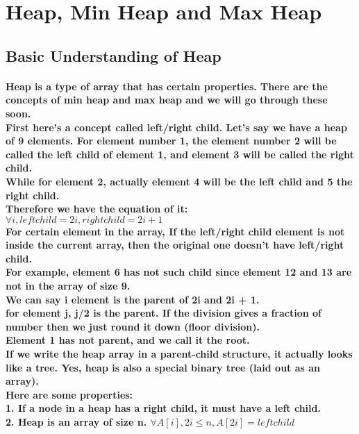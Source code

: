 \documentclass{article}
\begin{document}
\newpage

\section{Heap, Min Heap and Max Heap}

\subsection{Basic Understanding of Heap}

\paragraph{Heap is a type of array that has certain properties. There are the concepts of min heap and max heap and we will go through these soon.\\
First here's a concept called left/right child. Let's say we have a heap of 9 elements. For element number 1, the element number 2 will be called the left child of element 1, and element 3 will be called the right child.\\
While for element 2, actually element 4 will be the left child and 5 the right child.\\
Therefore we have the equation of it:\\
$\forall i,leftchild = 2i,rightchild = 2i + 1$\\
For certain element in the array, If the left/right child element is not inside the current array, then the original one doesn't have left/right child.\\
For example, element 6 has not such child since element 12 and 13 are not in the array of size 9.\\
We can say i element is the parent of 2i and 2i + 1.\\
for element j, j/2 is the parent. If the division gives a fraction of number then we just round it down (floor division).\\
Element 1 has not parent, and we call it the root.\\
If we write the heap array in a parent-child structure, it actually looks like a tree. Yes, heap is also a special binary tree (laid out as an array).\\
Here are some properties:\\
1. If a node in a heap has a right child, it must have a left child.\\
2. Heap is an array of size n. $\forall A[i],2i \leq n,A[2i] = leftchild$\\
}
\end{document}
